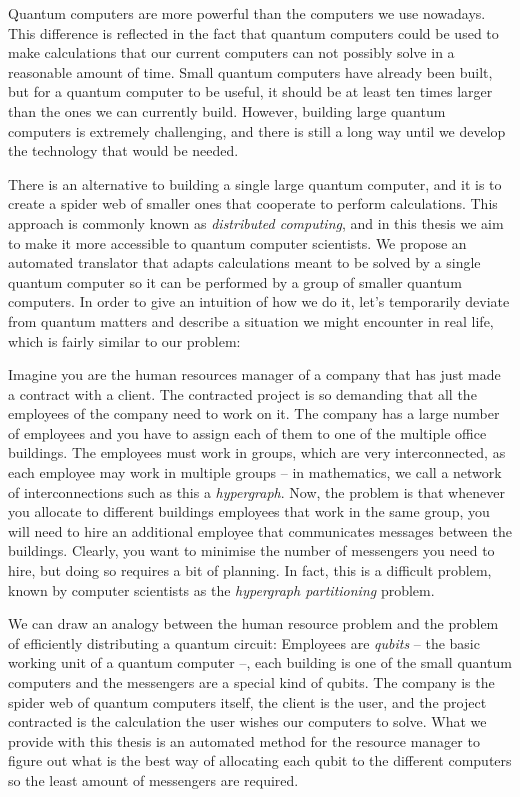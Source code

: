 Quantum computers are more powerful than the computers we use nowadays. This difference is reflected in the fact that quantum computers could be used to make calculations that our current computers can not possibly solve in a reasonable amount of time. Small quantum computers have already been built, but for a quantum computer to be useful, it should be at least ten times larger than the ones we can currently build. However, building large quantum computers is extremely challenging, and there is still a long way until we develop the technology that would be needed.

There is an alternative to building a single large quantum computer, and it is to create a spider web of smaller ones that cooperate to perform calculations. This approach is commonly known as \textit{distributed computing}, and in this thesis we aim to make it more accessible to quantum computer scientists. We propose an automated translator that adapts calculations meant to be solved by a single quantum computer so it can be performed by a group of smaller quantum computers. In order to give an intuition of how we do it, let's temporarily deviate from quantum matters and describe a situation we might encounter in real life, which is fairly similar to our problem: 

Imagine you are the human resources manager of a company that has just made a contract with a client. The contracted project is so demanding that all the employees of the company need to work on it. The company has a large number of employees and you have to assign each of them to one of the multiple office buildings. The employees must work in groups, which are very interconnected, as each employee may work in multiple groups -- in mathematics, we call a network of interconnections such as this a \textit{hypergraph}. Now, the problem is that whenever you allocate to different buildings employees that work in the same group, you will need to hire an additional employee that communicates messages between the buildings. Clearly, you want to minimise the number of messengers you need to hire, but doing so requires a bit of planning. In fact, this is a difficult problem, known by computer scientists as the \textit{hypergraph partitioning} problem.

We can draw an analogy between the human resource problem and the problem of efficiently distributing a quantum circuit: Employees are \textit{qubits} -- the basic working unit of a quantum computer --, each building is one of the small quantum computers and the messengers are a special kind of qubits. The company is the spider web of quantum computers itself, the client is the user, and the project contracted is the calculation the user wishes our computers to solve. What we provide with this thesis is an automated method for the resource manager to figure out what is the best way of allocating each qubit to the different computers so the least amount of messengers are required.


